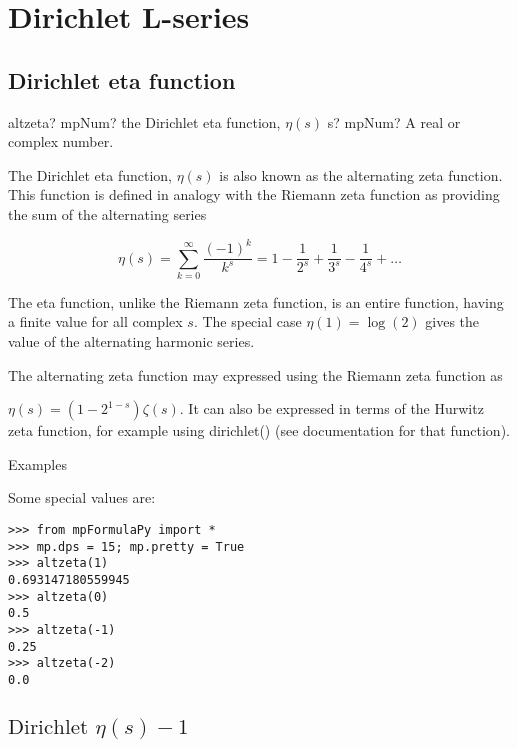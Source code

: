 \newpage
\section{Dirichlet L-series}

\subsection{Dirichlet eta function}


\begin{mpFunctionsExtract}
	\mpFunctionOne
	{altzeta? mpNum? the Dirichlet eta function, $\eta(s)$}
	{s? mpNum? A real or complex number.}
\end{mpFunctionsExtract}


The Dirichlet eta function, $\eta(s)$ is also known as the alternating zeta function. This function is defined in analogy with the Riemann zeta function as providing the sum of the alternating series

\begin{equation}
\eta(s) = \sum_{k=0}^{\infty} \frac{(-1)^k}{k^s} = 1- \frac{1}{2^s} + \frac{1}{3^s}  - \frac{1}{4^s} + \ldots
\end{equation}

The eta function, unlike the Riemann zeta function, is an entire function, having a finite value for all complex $s$. The special case $\eta(1)=\log(2)$ gives the value of the alternating harmonic series.

\vpara
The alternating zeta function may expressed using the Riemann zeta function as 

$\eta(s)=(1-2^{1-s}) \zeta(s)$. It can also be expressed in terms of the Hurwitz zeta function, for example using dirichlet() (see documentation for that function).

Examples

Some special values are:

\begin{lstlisting}
>>> from mpFormulaPy import *
>>> mp.dps = 15; mp.pretty = True
>>> altzeta(1)
0.693147180559945
>>> altzeta(0)
0.5
>>> altzeta(-1)
0.25
>>> altzeta(-2)
0.0
\end{lstlisting}



\subsection{\texorpdfstring{$\text{Dirichlet }\eta(s)-1$}{Gammax}}

